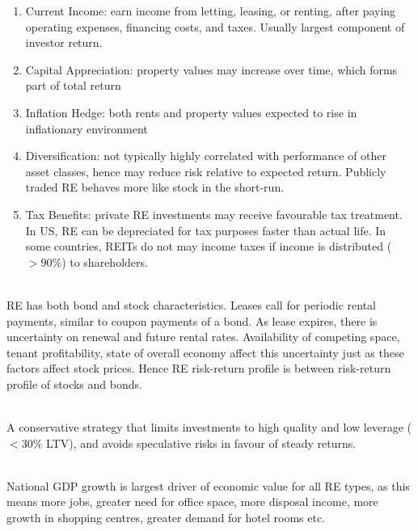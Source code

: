\begin{remark} 
\begin{enumerate}[label=\roman*.]
\setlength{\itemsep}{0pt}
\item Current Income: earn income from letting, leasing, or renting, after paying operating expenses, financing costs, and taxes. Usually largest component of investor return.
\item Capital Appreciation: property values may increase over time, which forms part of total return
\item Inflation Hedge: both rents and property values expected to rise in inflationary environment
\item Diversification: not typically highly correlated with performance of other asset classes, hence may reduce risk relative to expected return. Publicly traded RE behaves more like stock in the short-run.
\item Tax Benefits: private RE investments may receive favourable tax treatment. In US, RE can be depreciated for tax purposes faster than actual life. In some countries, REITs do not may income taxes if income is distributed ($> 90\%$) to shareholders.
\end{enumerate}
\end{remark}

\begin{remark} \\
RE has both bond and stock characteristics. Leases call for periodic rental payments, similar to coupon payments of a bond. As lease expires, there is uncertainty on renewal and future rental rates. Availability of competing space, tenant profitability, state of overall economy affect this uncertainty just as these factors affect stock prices. Hence RE risk-return profile is between risk-return profile of stocks and bonds.
\end{remark}

\begin{remark} \\
A conservative strategy that limits investments to high quality and low leverage ($< 30\%$ LTV), and avoids speculative risks in favour of steady returns.
\end{remark}

\begin{remark} \\
National GDP growth is largest driver of economic value for all RE types, as this means more jobs, greater need for office space, more disposal income, more growth in shopping centres, greater demand for hotel rooms etc.
\end{remark}

